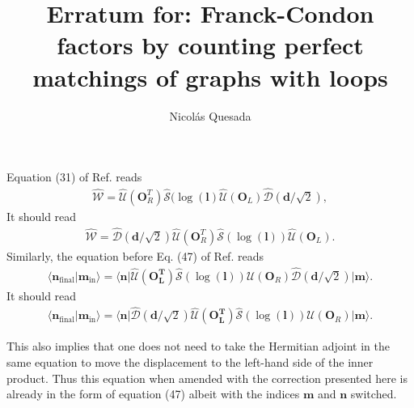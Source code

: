\documentclass[twocolumn,pra]{revtex4}
\newcommand{\ket}[1]{| #1 \rangle}
\newcommand{\bra}[1]{\langle #1 |}
\newcommand{\braket}[1]{\langle #1 \rangle}
\newcommand{\eq}[1]{\begin{align}#1\end{align}}
\begin{document}
\title{Erratum for: Franck-Condon factors by counting perfect matchings of graphs with loops
}
\author{Nicol\'as Quesada}

\maketitle
Equation (31) of Ref. \cite{quesada2019franck} reads
\eq{
\mathcal{\hat W} = \mathcal{\hat U}(\bm{O}_R^T) \mathcal{\hat S}(\log(\bm{l})	\mathcal{\hat U}(\bm{O}_L) \mathcal{\hat D}(\bm{d}/\sqrt{2}),
}
It should read
\eq{
\mathcal{\hat W} = \mathcal{\hat  D}(\bm{d}/\sqrt{2}) \mathcal{\hat U}(\bm{O}_R^T) \mathcal{\hat S}(\log(\bm{l}))	\mathcal{\hat U}(\bm{O}_L) 	.
}
Similarly, the equation before Eq. (47) of Ref. \cite{quesada2019franck} reads
\eq{
\braket{\bm{n}_{\text{final}}|\bm{m}_{\text{in}}} = \bra{\bm{n}} \mathcal{\hat U}(\bm{O_L^T}) \mathcal{\hat S}(\log(\bm{l})) \mathcal{U}(\bm{O}_R) \mathcal{\hat D}(\bm{d}/\sqrt{2}) \ket{\bm{m}}.
}
It should read
\eq{
\braket{\bm{n}_{\text{final}}|\bm{m}_{\text{in}}} = \bra{\bm{n}}  \mathcal{\hat D}(\bm{d}/\sqrt{2})  \mathcal{\hat U}(\bm{O_L^T}) \mathcal{\hat S}(\log(\bm{l})) \mathcal{U}(\bm{O}_R) \ket{\bm{m}}.
}


This also implies that one does not need to take the Hermitian adjoint in the same equation to move the displacement to the left-hand side of the inner product.
Thus this equation when amended with the correction presented here is already in the form of equation (47) albeit with the indices $\bm{m}$ and $\bm{n}$ switched.



\end{document}
